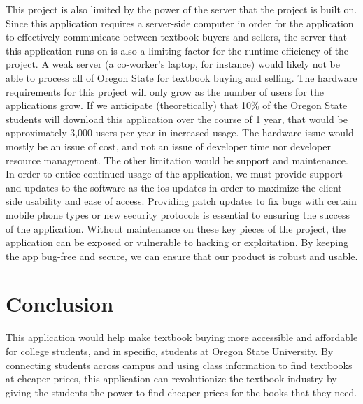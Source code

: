 \documentclass[12pt]{article}
\begin{document}
\par This project is also limited by the power of the server that the project is built on. Since this application requires a server-side computer in order for the application to effectively communicate between textbook buyers and sellers, the server that this application runs on is also a limiting factor for the runtime efficiency of the project. A weak server (a co-worker’s laptop, for instance) would likely not be able to process all of Oregon State for textbook buying and selling. The hardware requirements for this project will only grow as the number of users for the applications grow. If we anticipate (theoretically) that 10\% of the Oregon State students will download this application over the course of 1 year, that would be approximately 3,000 users per year in increased usage. The hardware issue would mostly be an issue of cost, and not an issue of developer time nor developer resource management.
The other limitation would be support and maintenance. In order to entice continued usage of the application, we must provide support and updates to the software as the ios updates in order to maximize the client side usability and ease of access. Providing patch updates to fix bugs with certain mobile phone types or new security protocols is essential to ensuring the success of the application. Without maintenance on these key pieces of the project, the application can be exposed or vulnerable to hacking or exploitation. By keeping the app bug-free and secure, we can ensure that our product is robust and usable.


\section{Conclusion}
This application would help make textbook buying more accessible and affordable for college students, and in specific, students at Oregon State University. By connecting students across campus and using class information to find textbooks at cheaper prices, this application can revolutionize the textbook industry by giving the students the power to find cheaper prices for the books that they need.

\cite{bookhuff}
\cite{booknbc}



\end{document}
